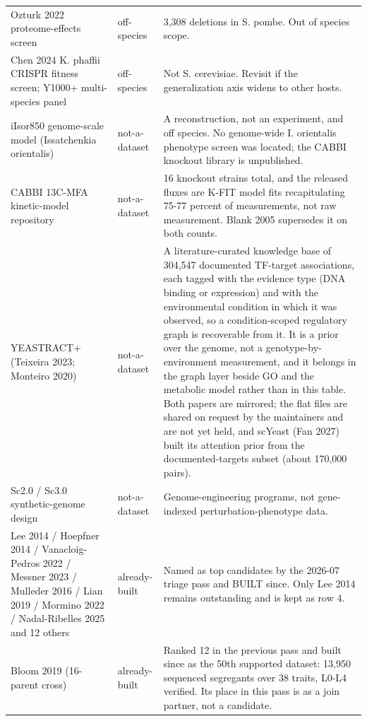 \begin{longtable}{@{}L{62mm} L{22mm} L{85mm}@{}}
\addlinespace[5pt]
Ozturk 2022 proteome-effects screen & off-species & 3,308 deletions in S. pombe. Out of species scope. \\
\addlinespace[5pt]
Chen 2024 K. phaffii CRISPR fitness screen; Y1000+ multi-species panel & off-species & Not S. cerevisiae. Revisit if the generalization axis widens to other hosts. \\
\addlinespace[5pt]
iIsor850 genome-scale model (Issatchenkia orientalis) & not-a-dataset & A reconstruction, not an experiment, and off species. No genome-wide I. orientalis phenotype screen was located; the CABBI knockout library is unpublished. \\
\addlinespace[5pt]
CABBI 13C-MFA kinetic-model repository & not-a-dataset & 16 knockout strains total, and the released fluxes are K-FIT model fits recapitulating 75-77 percent of measurements, not raw measurement. Blank 2005 supersedes it on both counts. \\
\addlinespace[5pt]
YEASTRACT+ (Teixeira 2023; Monteiro 2020) & not-a-dataset & A literature-curated knowledge base of 304,547 documented TF-target associations, each tagged with the evidence type (DNA binding or expression) and with the environmental condition in which it was observed, so a condition-scoped regulatory graph is recoverable from it. It is a prior over the genome, not a genotype-by-environment measurement, and it belongs in the graph layer beside GO and the metabolic model rather than in this table. Both papers are mirrored; the flat files are shared on request by the maintainers and are not yet held, and scYeast (Fan 2027) built its attention prior from the documented-targets subset (about 170,000 pairs). \\
\addlinespace[5pt]
Sc2.0 / Sc3.0 synthetic-genome design & not-a-dataset & Genome-engineering programs, not gene-indexed perturbation-phenotype data. \\
\addlinespace[5pt]
Lee 2014 / Hoepfner 2014 / Vanacloig-Pedros 2022 / Messner 2023 / Mulleder 2016 / Lian 2019 / Mormino 2022 / Nadal-Ribelles 2025 and 12 others & already-built & Named as top candidates by the 2026-07 triage pass and BUILT since. Only Lee 2014 remains outstanding and is kept as row 4. \\
\addlinespace[5pt]
Bloom 2019 (16-parent cross) & already-built & Ranked 12 in the previous pass and built since as the 50th supported dataset: 13,950 sequenced segregants over 38 traits, L0-L4 verified. Its place in this pass is as a join partner, not a candidate. \\

\end{longtable}
